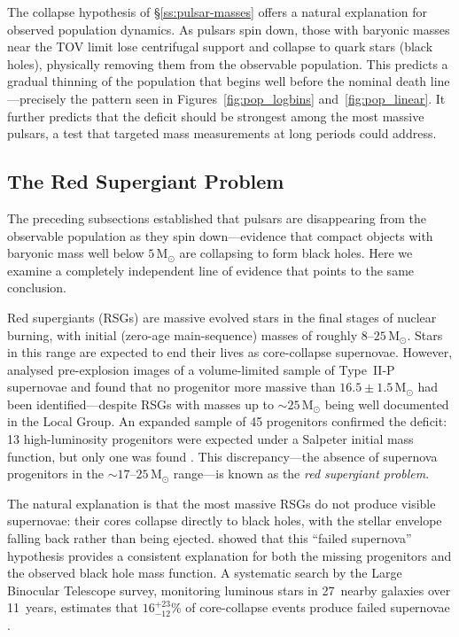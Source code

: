 \documentclass[manuscript,linenumbers]{aastex701}
\newcommand{\Msun}{\mathrm{M}_\odot}
\begin{document}
The collapse hypothesis of \S\ref{ss:pulsar-masses} offers a natural
explanation for observed population dynamics.  As pulsars spin down,
those with baryonic masses near the TOV limit lose centrifugal support
and collapse to quark stars (black holes), physically removing them
from the observable population.  This predicts a gradual thinning of
the population that begins well before the nominal death
line---precisely the pattern seen in Figures~\ref{fig:pop_logbins}
and~\ref{fig:pop_linear}.  It further predicts that the deficit should
be strongest among the most massive pulsars, a test that targeted mass
measurements at long periods could address.

\subsection{The Red Supergiant Problem}\label{ss:rsg}

The preceding subsections established that pulsars are disappearing
from the observable population as they spin down---evidence that
compact objects with baryonic mass well below $5\,\Msun$ are
collapsing to form black holes.  Here we examine a completely
independent line of evidence that points to the same conclusion.

Red supergiants (RSGs) are massive evolved stars in the final stages
of nuclear burning, with initial (zero-age main-sequence) masses of
roughly $8$--$25\,\Msun$.  Stars in this range are expected to
end their lives as core-collapse supernovae.  However,
\citet{Smartt2009} analysed pre-explosion images of a volume-limited
sample of Type~II-P supernovae and found that no progenitor more
massive than $16.5 \pm 1.5\,\Msun$ had been identified---despite
RSGs with masses up to ${\sim}25\,\Msun$ being well documented
in the Local Group.  An expanded sample of 45 progenitors confirmed
the deficit: 13 high-luminosity progenitors were expected under a
Salpeter initial mass function, but only one was found
\citep{Smartt2015}.  This discrepancy---the absence of supernova
progenitors in the ${\sim}17$--$25\,\Msun$ range---is known as
the \emph{red supergiant problem}.

The natural explanation is that the most massive RSGs do not produce
visible supernovae: their cores collapse directly to black holes,
with the stellar envelope falling back rather than being ejected.
\citet{Kochanek2020} showed that this ``failed supernova'' hypothesis
provides a consistent explanation for both the missing progenitors
and the observed black hole mass function.  A systematic search by
the Large Binocular Telescope survey, monitoring luminous stars in
27~nearby galaxies over 11~years, estimates that
$16^{+23}_{-12}$\% of core-collapse events produce failed supernovae
\citep{NeustadtKochanek2021}.
\end{document}
